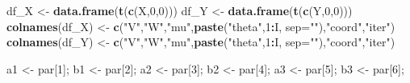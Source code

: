 \documentclass[
]{article}
\newenvironment{Shaded}{\begin{snugshade}}{\end{snugshade}}
\newcommand{\AttributeTok}[1]{\textcolor[rgb]{0.13,0.29,0.53}{#1}}
\newcommand{\DecValTok}[1]{\textcolor[rgb]{0.00,0.00,0.81}{#1}}
\newcommand{\FunctionTok}[1]{\textcolor[rgb]{0.13,0.29,0.53}{\textbf{#1}}}
\newcommand{\NormalTok}[1]{#1}
\newcommand{\OtherTok}[1]{\textcolor[rgb]{0.56,0.35,0.01}{#1}}
\newcommand{\SpecialCharTok}[1]{\textcolor[rgb]{0.81,0.36,0.00}{\textbf{#1}}}
\newcommand{\StringTok}[1]{\textcolor[rgb]{0.31,0.60,0.02}{#1}}
\begin{document}
\begin{Shaded}
\begin{Highlighting}[]
\NormalTok{  df\_X }\OtherTok{\textless{}{-}} \FunctionTok{data.frame}\NormalTok{(}\FunctionTok{t}\NormalTok{(}\FunctionTok{c}\NormalTok{(X,}\DecValTok{0}\NormalTok{,}\DecValTok{0}\NormalTok{)))}
\NormalTok{  df\_Y }\OtherTok{\textless{}{-}} \FunctionTok{data.frame}\NormalTok{(}\FunctionTok{t}\NormalTok{(}\FunctionTok{c}\NormalTok{(Y,}\DecValTok{0}\NormalTok{,}\DecValTok{0}\NormalTok{)))}
  \FunctionTok{colnames}\NormalTok{(df\_X) }\OtherTok{\textless{}{-}} \FunctionTok{c}\NormalTok{(}\StringTok{"V"}\NormalTok{,}\StringTok{"W"}\NormalTok{,}\StringTok{"mu"}\NormalTok{,}\FunctionTok{paste}\NormalTok{(}\StringTok{"theta"}\NormalTok{,}\DecValTok{1}\SpecialCharTok{:}\NormalTok{I, }\AttributeTok{sep=}\StringTok{""}\NormalTok{),}\StringTok{"coord"}\NormalTok{,}\StringTok{"iter"}\NormalTok{)}
  \FunctionTok{colnames}\NormalTok{(df\_Y) }\OtherTok{\textless{}{-}} \FunctionTok{c}\NormalTok{(}\StringTok{"V"}\NormalTok{,}\StringTok{"W"}\NormalTok{,}\StringTok{"mu"}\NormalTok{,}\FunctionTok{paste}\NormalTok{(}\StringTok{"theta"}\NormalTok{,}\DecValTok{1}\SpecialCharTok{:}\NormalTok{I, }\AttributeTok{sep=}\StringTok{""}\NormalTok{),}\StringTok{"coord"}\NormalTok{,}\StringTok{"iter"}\NormalTok{)}
  
\NormalTok{  a1 }\OtherTok{\textless{}{-}}\NormalTok{ par[}\DecValTok{1}\NormalTok{]; b1 }\OtherTok{\textless{}{-}}\NormalTok{ par[}\DecValTok{2}\NormalTok{]; a2 }\OtherTok{\textless{}{-}}\NormalTok{ par[}\DecValTok{3}\NormalTok{]; b2 }\OtherTok{\textless{}{-}}\NormalTok{ par[}\DecValTok{4}\NormalTok{]; a3 }\OtherTok{\textless{}{-}}\NormalTok{ par[}\DecValTok{5}\NormalTok{]; b3 }\OtherTok{\textless{}{-}}\NormalTok{ par[}\DecValTok{6}\NormalTok{];}
    

\end{Highlighting}
\end{Shaded}
\end{document}
